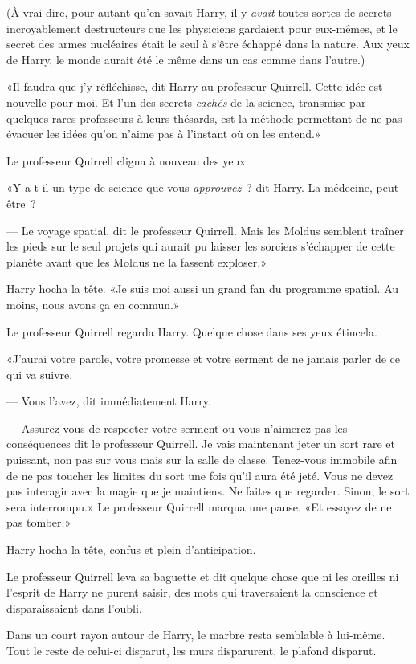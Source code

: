 (À vrai dire, pour autant qu'en savait Harry, il y \emph{avait} toutes sortes de secrets incroyablement destructeurs que les physiciens gardaient pour eux-mêmes, et le secret des armes nucléaires était le seul à s'être échappé dans la nature. Aux yeux de Harry, le monde aurait été le même dans un cas comme dans l'autre.)

«Il faudra que j'y réfléchisse, dit Harry au professeur Quirrell. Cette idée est nouvelle pour moi. Et l'un des secrets \emph{cachés} de la science, transmise par quelques rares professeurs à leurs thésards, est la méthode permettant de ne pas évacuer les idées qu'on n'aime pas à l'instant où on les entend.»

Le professeur Quirrell cligna à nouveau des yeux.

«Y a-t-il un type de science que vous \emph{approuvez}~? dit Harry. La médecine, peut-être~?

--- Le voyage spatial, dit le professeur Quirrell. Mais les Moldus semblent traîner les pieds sur le seul projets qui aurait pu laisser les sorciers s'échapper de cette planète avant que les Moldus ne la fassent exploser.»

Harry hocha la tête. «Je suis moi aussi un grand fan du programme spatial. Au moins, nous avons ça en commun.»

Le professeur Quirrell regarda Harry. Quelque chose dans ses yeux étincela.

«J'aurai votre parole, votre promesse et votre serment de ne jamais parler de ce qui va suivre.

--- Vous l'avez, dit immédiatement Harry.

--- Assurez-vous de respecter votre serment ou vous n'aimerez pas les conséquences dit le professeur Quirrell. Je vais maintenant jeter un sort rare et puissant, non pas sur vous mais sur la salle de classe. Tenez-vous immobile afin de ne pas toucher les limites du sort une fois qu'il aura été jeté. Vous ne devez pas interagir avec la magie que je maintiens. Ne faites que regarder. Sinon, le sort sera interrompu.» Le professeur Quirrell marqua une pause. «Et essayez de ne pas tomber.»

Harry hocha la tête, confus et plein d'anticipation.

Le professeur Quirrell leva sa baguette et dit quelque chose que ni les oreilles ni l'esprit de Harry ne purent saisir, des mots qui traversaient la conscience et disparaissaient dans l'oubli.

Dans un court rayon autour de Harry, le marbre resta semblable à lui-même. Tout le reste de celui-ci disparut, les murs disparurent, le plafond disparut.

